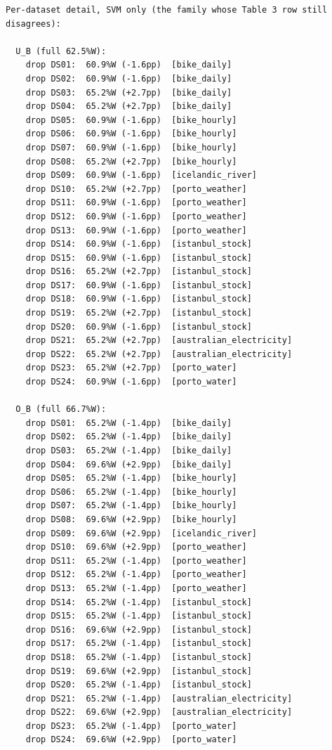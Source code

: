 \begin{verbatim}
Per-dataset detail, SVM only (the family whose Table 3 row still disagrees):

  U_B (full 62.5%W):
    drop DS01:  60.9%W (-1.6pp)  [bike_daily]
    drop DS02:  60.9%W (-1.6pp)  [bike_daily]
    drop DS03:  65.2%W (+2.7pp)  [bike_daily]
    drop DS04:  65.2%W (+2.7pp)  [bike_daily]
    drop DS05:  60.9%W (-1.6pp)  [bike_hourly]
    drop DS06:  60.9%W (-1.6pp)  [bike_hourly]
    drop DS07:  60.9%W (-1.6pp)  [bike_hourly]
    drop DS08:  65.2%W (+2.7pp)  [bike_hourly]
    drop DS09:  60.9%W (-1.6pp)  [icelandic_river]
    drop DS10:  65.2%W (+2.7pp)  [porto_weather]
    drop DS11:  60.9%W (-1.6pp)  [porto_weather]
    drop DS12:  60.9%W (-1.6pp)  [porto_weather]
    drop DS13:  60.9%W (-1.6pp)  [porto_weather]
    drop DS14:  60.9%W (-1.6pp)  [istanbul_stock]
    drop DS15:  60.9%W (-1.6pp)  [istanbul_stock]
    drop DS16:  65.2%W (+2.7pp)  [istanbul_stock]
    drop DS17:  60.9%W (-1.6pp)  [istanbul_stock]
    drop DS18:  60.9%W (-1.6pp)  [istanbul_stock]
    drop DS19:  65.2%W (+2.7pp)  [istanbul_stock]
    drop DS20:  60.9%W (-1.6pp)  [istanbul_stock]
    drop DS21:  65.2%W (+2.7pp)  [australian_electricity]
    drop DS22:  65.2%W (+2.7pp)  [australian_electricity]
    drop DS23:  65.2%W (+2.7pp)  [porto_water]
    drop DS24:  60.9%W (-1.6pp)  [porto_water]

  O_B (full 66.7%W):
    drop DS01:  65.2%W (-1.4pp)  [bike_daily]
    drop DS02:  65.2%W (-1.4pp)  [bike_daily]
    drop DS03:  65.2%W (-1.4pp)  [bike_daily]
    drop DS04:  69.6%W (+2.9pp)  [bike_daily]
    drop DS05:  65.2%W (-1.4pp)  [bike_hourly]
    drop DS06:  65.2%W (-1.4pp)  [bike_hourly]
    drop DS07:  65.2%W (-1.4pp)  [bike_hourly]
    drop DS08:  69.6%W (+2.9pp)  [bike_hourly]
    drop DS09:  69.6%W (+2.9pp)  [icelandic_river]
    drop DS10:  69.6%W (+2.9pp)  [porto_weather]
    drop DS11:  65.2%W (-1.4pp)  [porto_weather]
    drop DS12:  65.2%W (-1.4pp)  [porto_weather]
    drop DS13:  65.2%W (-1.4pp)  [porto_weather]
    drop DS14:  65.2%W (-1.4pp)  [istanbul_stock]
    drop DS15:  65.2%W (-1.4pp)  [istanbul_stock]
    drop DS16:  69.6%W (+2.9pp)  [istanbul_stock]
    drop DS17:  65.2%W (-1.4pp)  [istanbul_stock]
    drop DS18:  65.2%W (-1.4pp)  [istanbul_stock]
    drop DS19:  69.6%W (+2.9pp)  [istanbul_stock]
    drop DS20:  65.2%W (-1.4pp)  [istanbul_stock]
    drop DS21:  65.2%W (-1.4pp)  [australian_electricity]
    drop DS22:  69.6%W (+2.9pp)  [australian_electricity]
    drop DS23:  65.2%W (-1.4pp)  [porto_water]
    drop DS24:  69.6%W (+2.9pp)  [porto_water]


\end{verbatim}
